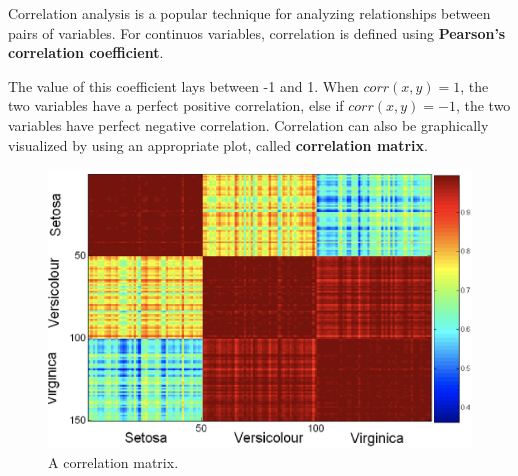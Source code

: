 Correlation analysis is a popular technique for analyzing relationships between pairs of variables. For continuos variables, correlation is defined using \textbf{Pearson's correlation coefficient}.


The value of this coefficient lays between -1 and 1. When $corr(x,y) = 1$, the two variables have a perfect positive correlation, else if $corr(x,y) = -1$, the two variables have perfect negative correlation. Correlation can also be graphically visualized by using an appropriate plot, called \textbf{correlation matrix}.

\begin{figure}[h]
    \centering
    \includegraphics[width=0.4\linewidth]{img/correlation matrix.png}
    \caption{A correlation matrix.}
\end{figure}